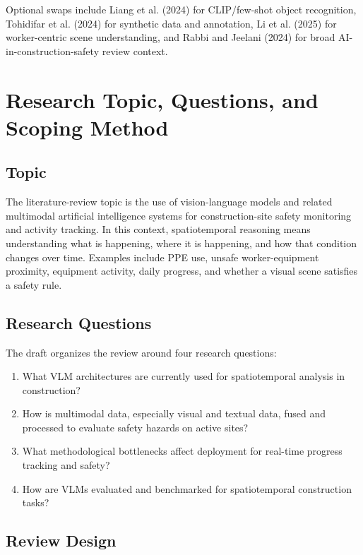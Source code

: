 \documentclass[10pt,letterpaper]{article}
\begin{document}
Optional swaps include Liang et al. (2024) for CLIP/few-shot object recognition, Tohidifar et al. (2024) for synthetic data and annotation, Li et al. (2025) for worker-centric scene understanding, and Rabbi and Jeelani (2024) for broad AI-in-construction-safety review context.

\section{Research Topic, Questions, and Scoping Method}

\subsection{Topic}

The literature-review topic is the use of vision-language models and related multimodal artificial intelligence systems for construction-site safety monitoring and activity tracking. In this context, spatiotemporal reasoning means understanding what is happening, where it is happening, and how that condition changes over time. Examples include PPE use, unsafe worker-equipment proximity, equipment activity, daily progress, and whether a visual scene satisfies a safety rule.

\subsection{Research Questions}

The draft organizes the review around four research questions:

\begin{enumerate}
\item What VLM architectures are currently used for spatiotemporal analysis in construction?
\item How is multimodal data, especially visual and textual data, fused and processed to evaluate safety hazards on active sites?
\item What methodological bottlenecks affect deployment for real-time progress tracking and safety?
\item How are VLMs evaluated and benchmarked for spatiotemporal construction tasks?
\end{enumerate}

\subsection{Review Design}
\end{document}
